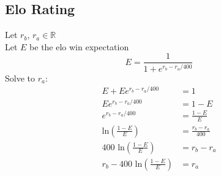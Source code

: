 \documentclass[12pt]{article}
\begin{document}
\subsection{Elo Rating}\label{sec:eloGet}
Let \(r_b\), \(r_a \in \mathbb R\)\\
Let \(E\) be the elo win expectation
\begin{equation}
E = \frac{1}{1+e^{r_b - r_a/400}}
\end{equation}
Solve to \(r_a\):
\begin{align}
E + Ee^{r_b - r_a/400} &= 1\\
Ee^{r_b - r_a/400} &= 1 - E\\
e^{r_b - r_a/400} &= \frac{1 - E}{E}\\
\text{ln}\left(\frac{1 - E}{E}\right) &= \frac{r_b - r_a}{400}\\
400 \text{ ln}\left(\frac{1 - E}{E}\right) &= r_b - r_a\\
r_b - 400 \text{ ln}\left(\frac{1 - E}{E}\right)  &= r_a
\end{align}
\end{document}
